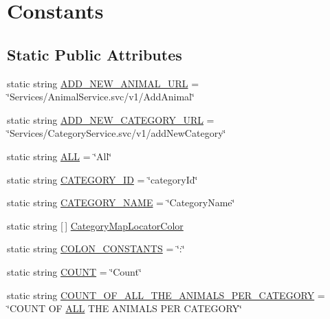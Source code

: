 \hypertarget{classWildlifeTrackingApp_1_1Utility_1_1Constants}{}\section{Constants}
\label{classWildlifeTrackingApp_1_1Utility_1_1Constants}
\subsection*{Static Public Attributes}
\begin{DoxyCompactItemize}
\item 
static string \hyperlink{classWildlifeTrackingApp_1_1Utility_1_1Constants_a123c1c5bb235a2e006300c385c8af3c4}{A\+D\+D\+\_\+\+N\+E\+W\+\_\+\+A\+N\+I\+M\+A\+L\+\_\+\+U\+RL} = \char`\"{}Services/Animal\+Service.\+svc/v1/Add\+Animal\char`\"{}
\item 
static string \hyperlink{classWildlifeTrackingApp_1_1Utility_1_1Constants_adee90abc1a8828f9962b7a2f05b3fce6}{A\+D\+D\+\_\+\+N\+E\+W\+\_\+\+C\+A\+T\+E\+G\+O\+R\+Y\+\_\+\+U\+RL} = \char`\"{}Services/Category\+Service.\+svc/v1/add\+New\+Category\char`\"{}
\item 
static string \hyperlink{classWildlifeTrackingApp_1_1Utility_1_1Constants_a50a6829a782e9be781fa98bfa5a7f04e}{A\+LL} = \char`\"{}All\char`\"{}
\item 
static string \hyperlink{classWildlifeTrackingApp_1_1Utility_1_1Constants_a8e7cd9f72334c5cc9097557a2b873d7b}{C\+A\+T\+E\+G\+O\+R\+Y\+\_\+\+ID} = \char`\"{}category\+Id\char`\"{}
\item 
static string \hyperlink{classWildlifeTrackingApp_1_1Utility_1_1Constants_aa83ef34c140142171da77a3cec88cf7e}{C\+A\+T\+E\+G\+O\+R\+Y\+\_\+\+N\+A\+ME} = \char`\"{}Category\+Name\char`\"{}
\item 
static string \mbox{[}$\,$\mbox{]} \hyperlink{classWildlifeTrackingApp_1_1Utility_1_1Constants_a5f8721853059da36c3a719d8f04eb551}{Category\+Map\+Locator\+Color}
\item 
static string \hyperlink{classWildlifeTrackingApp_1_1Utility_1_1Constants_a9ffe83f09b9dd422b8b1f94a4f4a6a21}{C\+O\+L\+O\+N\+\_\+\+C\+O\+N\+S\+T\+A\+N\+TS} = \char`\"{}\+:\char`\"{}
\item 
static string \hyperlink{classWildlifeTrackingApp_1_1Utility_1_1Constants_ac70159f34c1d5ab4a729d8b789813775}{C\+O\+U\+NT} = \char`\"{}Count\char`\"{}
\item 
static string \hyperlink{classWildlifeTrackingApp_1_1Utility_1_1Constants_ae3ae8c5c26c8d602f72f2c040ecc038d}{C\+O\+U\+N\+T\+\_\+\+O\+F\+\_\+\+A\+L\+L\+\_\+\+T\+H\+E\+\_\+\+A\+N\+I\+M\+A\+L\+S\+\_\+\+P\+E\+R\+\_\+\+C\+A\+T\+E\+G\+O\+RY} = \char`\"{}C\+O\+U\+NT OF \hyperlink{classWildlifeTrackingApp_1_1Utility_1_1Constants_a50a6829a782e9be781fa98bfa5a7f04e}{A\+LL} T\+HE A\+N\+I\+M\+A\+LS P\+ER C\+A\+T\+E\+G\+O\+RY\char`\"{}

\end{DoxyCompactItemize}
